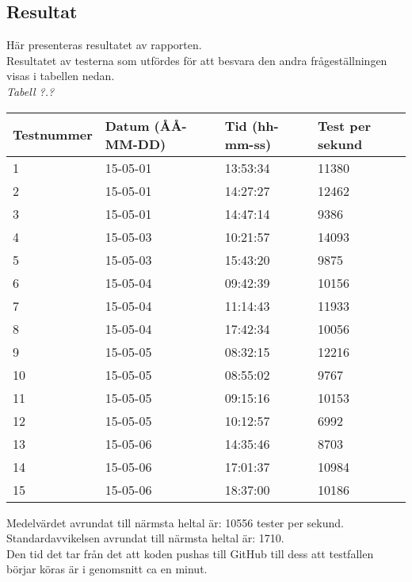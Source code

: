 \subsection{Resultat}
Här presenteras resultatet av rapporten.\\

Resultatet av testerna som utfördes för att besvara den andra frågeställningen
visas i tabellen nedan.\\

\noindent\emph{Tabell ?.?}
\begin{center}
  \begin{tabular}{| l | l | l | l |}
  \hline
  Testnummer & Datum (ÅÅ-MM-DD) & Tid (hh-mm-ss) & Test per sekund\\ \hline
  1 & 15-05-01 & 13:53:34 & 11380\\ \hline
  2 & 15-05-01 & 14:27:27 & 12462\\ \hline
  3 & 15-05-01 & 14:47:14 & 9386\\ \hline 
  4 & 15-05-03 & 10:21:57 & 14093\\ \hline 
  5 & 15-05-03 & 15:43:20 & 9875\\ \hline 
  6 & 15-05-04 & 09:42:39 & 10156\\ \hline 
  7 & 15-05-04 & 11:14:43 & 11933\\ \hline 
  8 & 15-05-04 & 17:42:34 & 10056\\ \hline 
  9 & 15-05-05 & 08:32:15 & 12216\\ \hline 
  10 & 15-05-05 & 08:55:02 & 9767\\ \hline 
  11 & 15-05-05 & 09:15:16 & 10153\\ \hline 
  12 & 15-05-05 & 10:12:57 & 6992\\ \hline 
  13 & 15-05-06 & 14:35:46 & 8703\\ \hline 
  14 & 15-05-06 & 17:01:37 & 10984\\ \hline 
  15 & 15-05-06 & 18:37:00 & 10186\\ \hline 
  \end{tabular}
\end{center}

Medelvärdet avrundat till närmsta heltal är: 10556 tester per sekund.\\

Standardavvikelsen avrundat till närmsta heltal är: 1710.\\

Den tid det tar från det att koden pushas till GitHub till dess att 
testfallen börjar köras är i genomsnitt ca en minut.\\

